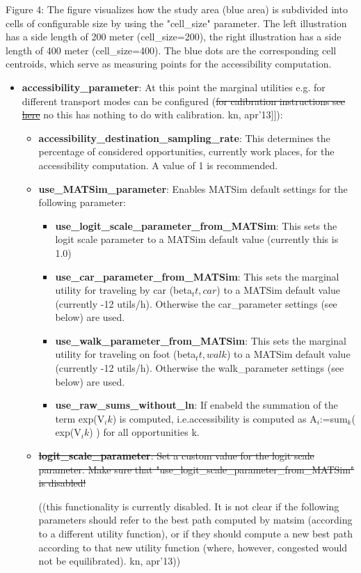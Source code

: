 Figure 4: The figure visualizes how the study area (blue area) is  subdivided into cells of configurable size by using the "cell\_size"  parameter. The left illustration has a side length of 200 meter  (cell\_size=200), the right illustration has a side length of 400 meter  (cell\_size=400). The blue dots are the corresponding cell centroids,  which serve as measuring points for the accessibility computation.
\begin{itemize}
	\item \textbf{accessibility\_parameter}: At this point the marginal utilities e.g. for different transport modes can be configured (\sout{for calibration instructions see \href{http://www.matsim.org/node/650}{here}} no this has nothing to do with calibration. kn, apr'13]]):   
\begin{itemize}
	\item \textbf{accessibility\_destination\_sampling\_rate}: This  determines the percentage of considered opportunities, currently work  places, for the accessibility computation. A value of 1 is recommended.
	\item \textbf{use\_MATSim\_parameter}: Enables MATSim default settings for the following parameter:     
\begin{itemize}
	\item \textbf{use\_logit\_scale\_parameter\_from\_MATSim}: This sets the logit scale parameter to a MATSim default value (currently this is 1.0)
	\item \textbf{use\_car\_parameter\_from\_MATSim}: This sets the marginal utility for traveling by car (beta$_tt,car$) to a MATSim default value (currently -12 utils/h). Otherwise the car\_parameter settings (see below) are used.
	\item \textbf{use\_walk\_parameter\_from\_MATSim}: This sets the marginal utility for traveling on foot (beta$_tt,walk$) to a MATSim default value (currently -12 utils/h). Otherwise the walk\_parameter settings (see below) are used.
	\item \textbf{use\_raw\_sums\_without\_ln}: If enabeld the summation of the term exp(V$_ik$) is computed, i.e.accessibility is computed as A$_i$:=sum$_k$( exp(V$_ik$) ) for all opportunities k.
\end{itemize}
	\item \sout{\textbf{logit\_scale\_parameter}: Set a custom value for the logit scale parameter. Make sure that "use\_logit\_scale\_parameter\_from\_MATSim" is disabled!}


((this functionality is currently disabled. It is not clear if the  following parameters should refer to the best path computed by matsim  (according to a different utility function), or if they should compute a  new best path according to that new utility function (where, however,  congested would not be equilibrated). kn, apr'13)) 


\end{itemize}
\end{itemize}
